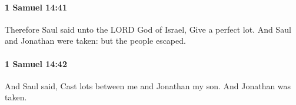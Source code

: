 		\paragraph{1 Samuel 14:41} %
			\label{1SAMUEL-14-41}

			Therefore Saul said unto the LORD God of Israel, Give a perfect lot. And Saul and Jonathan were taken: but the people escaped.


		\paragraph{1 Samuel 14:42} %
			\label{1SAMUEL-14-42}

			And Saul said, Cast lots between me and Jonathan my son. And Jonathan was taken.


